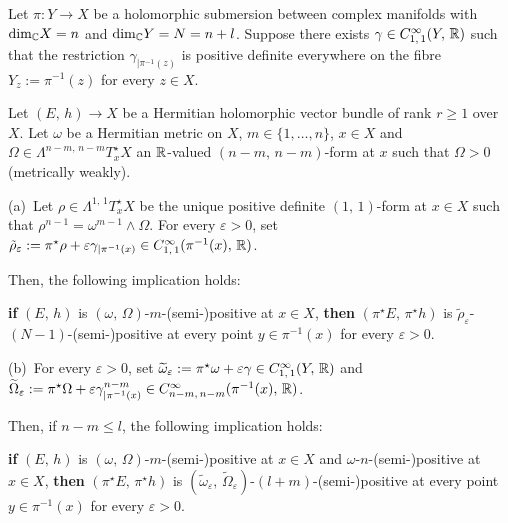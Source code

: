 \documentclass[12pt]{article}
\begin{document}
\begin{Prop}\label{Prop:m-pos_pullback} Let $\pi:Y\longrightarrow X$ be a holomorphic submersion between complex manifolds with $\mbox{dim}_{\mathbb{C}} X =n$ and $\mbox{dim}_{\mathbb{C}} Y = N = n+l$. Suppose there exists $\gamma\in C^\infty_{1,\,1}(Y,\,\mathbb{R})$ such that the restriction $\gamma_{|\pi^{-1}(z)}$ is positive definite everywhere on the fibre $Y_z:=\pi^{-1}(z)$ for every $z\in X$.

  Let $(E,\,h)\longrightarrow X$ be a Hermitian holomorphic vector bundle of rank $r\geq 1$ over $X$. Let $\omega$ be a Hermitian metric on $X$, $m\in\{1,\dots , n\}$, $x\in X$ and $\Omega\in\Lambda^{n-m,\,n-m}T^\star_x X$ an $\mathbb{R}$-valued $(n-m,\,n-m)$-form at $x$ such that $\Omega> 0$ (metrically weakly).

\vspace{1ex}  

 (a)\, Let $\rho\in\Lambda^{1,\,1}T^\star_x X$ be the unique positive definite $(1,\,1)$-form at $x\in X$ such that $\rho^{n-1} = \omega^{m-1}\wedge\Omega$. For every $\varepsilon>0$, set $\tilde\rho_\varepsilon:=\pi^\star\rho + \varepsilon\gamma_{|\pi^{-1}(x)}\in C^\infty_{1,\,1}(\pi^{-1}(x),\,\mathbb{R})$.

  Then, the following implication holds:

  \vspace{1ex}

  {\bf if} $(E,\,h)$ is  $(\omega,\,\Omega)$-$m$-(semi-)positive at $x\in X$, {\bf then} $(\pi^\star E,\,\pi^\star h)$ is $\tilde\rho_\varepsilon$-$(N-1)$-(semi-)positive at every point $y\in\pi^{-1}(x)$ for every $\varepsilon>0$.

  \vspace{1ex}  

  (b)\, For every $\varepsilon>0$, set $\widetilde\omega_\varepsilon:=\pi^\star\omega + \varepsilon\gamma \in C^\infty_{1,\,1}(Y,\,\mathbb{R})$ and $\widetilde\Omega_\varepsilon:=\pi^\star\Omega + \varepsilon\gamma^{n-m}_{|\pi^{-1}(x)}\in C^\infty_{n-m,\,n-m}(\pi^{-1}(x),\,\mathbb{R})$.

  Then, if $n-m\leq l$, the following implication holds:

  \vspace{1ex}

  {\bf if} $(E,\,h)$ is  $(\omega,\,\Omega)$-$m$-(semi-)positive at $x\in X$ and $\omega$-$n$-(semi-)positive at $x\in X$, {\bf then} $(\pi^\star E,\,\pi^\star h)$ is $(\widetilde\omega_\varepsilon,\,\widetilde\Omega_\varepsilon)$-$(l+m)$-(semi-)positive at every point $y\in\pi^{-1}(x)$ for every $\varepsilon>0$.

\end{Prop}  
\end{document}

